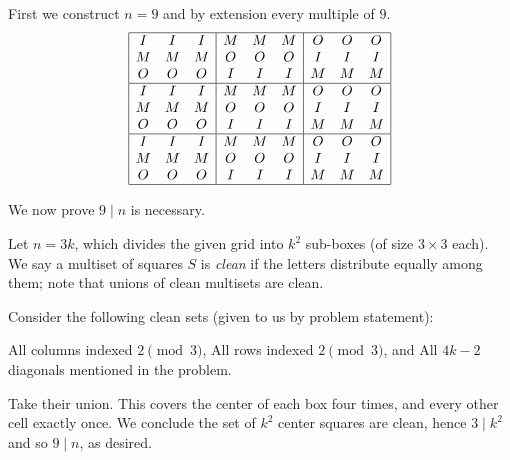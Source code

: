 \documentclass[11pt]{scrartcl}
\begin{document}
First we construct $n=9$ and by extension every multiple of $9$.
\[
 \begin{array}{|ccc|ccc|ccc|} \hline
  I & I & I & M & M & M & O & O & O \\
  M & M & M & O & O & O & I & I & I \\
  O & O & O & I & I & I & M & M & M \\\hline
  I & I & I & M & M & M & O & O & O \\
  M & M & M & O & O & O & I & I & I \\
  O & O & O & I & I & I & M & M & M \\\hline
  I & I & I & M & M & M & O & O & O \\
  M & M & M & O & O & O & I & I & I \\
  O & O & O & I & I & I & M & M & M \\\hline
 \end{array}
\]

We now prove $9 \mid n$ is necessary.

Let $n = 3k$, which divides the given grid into $k^2$ sub-boxes
(of size $3 \times 3$ each).
We say a multiset of squares $S$ is \emph{clean} if
the letters distribute equally among them;
note that unions of clean multisets are clean.

Consider the following clean sets (given to us by problem statement):
\begin{itemize}
\ii All columns indexed $2 \pmod 3$,
\ii All rows indexed $2 \pmod 3$, and
\ii All $4k-2$ diagonals mentioned in the problem.
\end{itemize}
Take their union.
This covers the center of each box four times,
and every other cell exactly once.
We conclude the set of $k^2$ center squares
are clean, hence $3 \mid k^2$ and so $9 \mid n$,
as desired.
\end{document}
